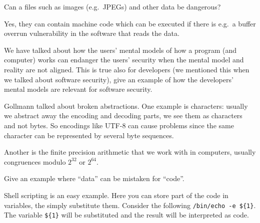 \question[3]\label{q:software}
Can a files such as images (e.g.\ JPEGs) and other data be dangerous?

\begin{solution}
  Yes, they can contain machine code which can be executed if there is e.g.\ 
  a buffer overrun vulnerability in the software that reads the data.
\end{solution}


\question[3]\label{q:software}
We have talked about how the users' mental models of how a program (and 
computer) works can endanger the users' security when the mental model and 
reality are not aligned.
This is true also for developers (we mentioned this when we talked about 
software security), give an example of how the developers' mental models are 
relevant for software security.

\begin{solution}
  Gollmann talked about broken abstractions.
  One example is characters: usually we abstract away the encoding and decoding 
  parts, we see them as characters and not bytes.
  So encodings like UTF-8 can cause problems since the same character can be 
  represented by several byte sequences.

  Another is the finite precision arithmetic that we work with in computers, 
  usually congruences modulo \(2^{32}\) or \(2^{64}\).
\end{solution}


\question[3]\label{q:software}
Give an example where \enquote{data} can be mistaken for \enquote{code}.

\begin{solution}
  Shell scripting is an easy example.
  Here you can store part of the code in variables, the simply substitute them.
  Consider the following \texttt{/bin/echo -e \$\{1\}}.
  The variable \texttt{\$\{1\}} will be substituted and the result will be 
  interpreted as code.
\end{solution}


